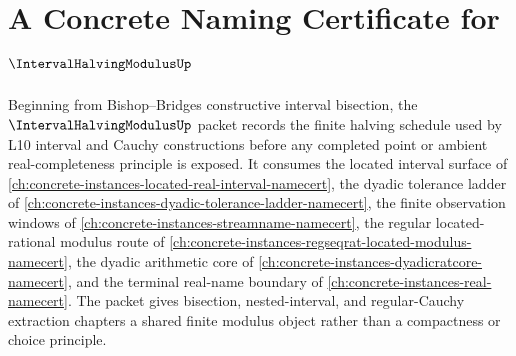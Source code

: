 \chapter{A Concrete Naming Certificate for $\IntervalHalvingModulusUp$}
\label{ch:concrete-instances-interval-halving-modulus-namecert}

Beginning from Bishop--Bridges constructive interval bisection, the $\IntervalHalvingModulusUp$ packet records the finite halving schedule used by L10 interval and Cauchy constructions before any completed point or ambient real-completeness principle is exposed. It consumes the located interval surface of \autoref{ch:concrete-instances-located-real-interval-namecert}, the dyadic tolerance ladder of \autoref{ch:concrete-instances-dyadic-tolerance-ladder-namecert}, the finite observation windows of \autoref{ch:concrete-instances-streamname-namecert}, the regular located-rational modulus route of \autoref{ch:concrete-instances-regseqrat-located-modulus-namecert}, the dyadic arithmetic core of \autoref{ch:concrete-instances-dyadicratcore-namecert}, and the terminal real-name boundary of \autoref{ch:concrete-instances-real-namecert}. The packet gives bisection, nested-interval, and regular-Cauchy extraction chapters a shared finite modulus object rather than a compactness or choice principle.


